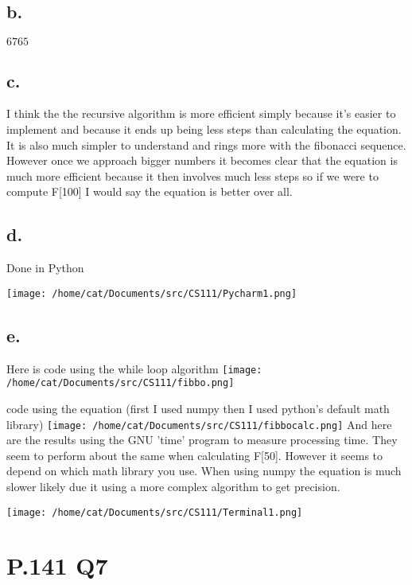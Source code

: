\documentclass{article}%
\begin{document}
\newpage

\subsection{b.}
$6765$

\subsection{c.}
I think the the recursive algorithm is more efficient simply because it's easier to implement and because it ends up being less steps than calculating the equation. It is also much simpler to understand and rings more with the fibonacci sequence. However once we approach bigger numbers it becomes clear that the equation is much more efficient because it then involves much less steps so if we were to compute F[100] I would say the equation is better over all. 
\newpage
\subsection{d.}
Done in Python
\newline
\begin{center}
\texttt{[image: /home/cat/Documents/src/CS111/Pycharm1.png]}
\end{center}


\subsection{e.}
Here is code using the while loop algorithm \newline
\texttt{[image: /home/cat/Documents/src/CS111/fibbo.png]}

code using the equation (first I used numpy then I used python's default math library) \newline
\texttt{[image: /home/cat/Documents/src/CS111/fibbocalc.png]}
\newpage
And here are the results using the GNU 'time' program to measure processing time. They seem to perform about the same when calculating F[50]. However it seems to depend on which math library you use. When using numpy the equation is much slower likely due it using a more complex algorithm to get precision.\newline

\texttt{[image: /home/cat/Documents/src/CS111/Terminal1.png]}

\newpage
\section{P.141 Q7}
\end{document}
